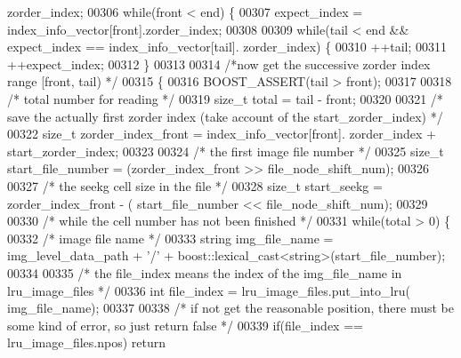 \begin{DoxyCode}
      zorder\_index;
00306         \textcolor{keywordflow}{while}(front < end) \{
00307                 expect\_index = index\_info\_vector[front].zorder\_index;
00308 
00309                 \textcolor{keywordflow}{while}(tail < end && expect\_index == index\_info\_vector[tail].
      zorder\_index) \{
00310                         ++tail;
00311                         ++expect\_index;
00312                 \}
00313 
00314                 \textcolor{comment}{/*now get the successive zorder index range [front, tail) */}
00315                 \{
00316                         BOOST\_ASSERT(tail > front);
00317 
00318                         \textcolor{comment}{/* total number for reading */}
00319                         \textcolor{keywordtype}{size\_t} total = tail - front;
00320 
00321                         \textcolor{comment}{/* save the actually first zorder index (take account
       of the start\_zorder\_index) */}
00322                         \textcolor{keywordtype}{size\_t} zorder\_index\_front = index\_info\_vector[front].
      zorder\_index + start\_zorder\_index;
00323 
00324                         \textcolor{comment}{/* the first image file number */}
00325                         \textcolor{keywordtype}{size\_t} start\_file\_number = (zorder\_index\_front >> 
      file\_node\_shift\_num);
00326 
00327                         \textcolor{comment}{/* the seekg cell size in the file */}
00328                         \textcolor{keywordtype}{size\_t} start\_seekg = zorder\_index\_front - (
      start\_file\_number << file\_node\_shift\_num);
00329 
00330                         \textcolor{comment}{/* while the cell number has not been finished */}
00331                         \textcolor{keywordflow}{while}(total > 0) \{
00332                                 \textcolor{comment}{/* image file name */}
00333                                 \textcolor{keywordtype}{string} img\_file\_name = img\_level\_data\_path + \textcolor{charliteral}{
      '/'} + boost::lexical\_cast<\textcolor{keywordtype}{string}>(start\_file\_number);
00334 
00335                                 \textcolor{comment}{/* the file\_index means the index of the
       img\_file\_name in lru\_image\_files */}
00336                                 \textcolor{keywordtype}{int} file\_index = lru\_image\_files.put\_into\_lru(
      img\_file\_name);
00337 
00338                                 \textcolor{comment}{/* if not get the reasonable position, there
       must be some kind of error, so just return false */}
00339                                 \textcolor{keywordflow}{if}(file\_index == lru\_image\_files.npos)  \textcolor{keywordflow}{return} \textcolor{keyword}{
}
\end{DoxyCode}
